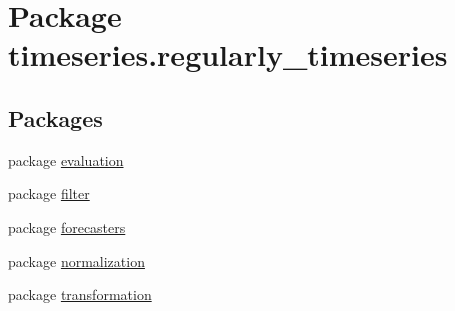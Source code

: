 \hypertarget{namespacetimeseries_1_1regularly__timeseries}{}\section{Package timeseries.\+regularly\+\_\+timeseries}
\label{namespacetimeseries_1_1regularly__timeseries}
\subsection*{Packages}
\begin{DoxyCompactItemize}
\item 
package \hyperlink{namespacetimeseries_1_1regularly__timeseries_1_1evaluation}{evaluation}
\item 
package \hyperlink{namespacetimeseries_1_1regularly__timeseries_1_1filter}{filter}
\item 
package \hyperlink{namespacetimeseries_1_1regularly__timeseries_1_1forecasters}{forecasters}
\item 
package \hyperlink{namespacetimeseries_1_1regularly__timeseries_1_1normalization}{normalization}
\item 
package \hyperlink{namespacetimeseries_1_1regularly__timeseries_1_1transformation}{transformation}
\end{DoxyCompactItemize}
